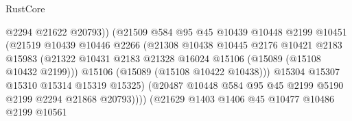 \begin{lexlean}{RustCore}
\begin{coremodule}
                                        @2294
                                        @21622
                                        @20793))
                                    (@21509
                                      @584
                                      @95
                                      @45
                                      @10439
                                      @10448
                                      @2199
                                      @10451
                                      (@21519
                                        @10439
                                        @10446
                                        @2266
                                        (@21308
                                          @10438
                                          @10445
                                          @2176
                                          @10421
                                          @2183
                                          @15983
                                          (@21322
                                            @10431
                                            @2183
                                            @21328
                                            @16024
                                            @15106
                                            (@15089 (@15108 @10432 @2199)))
                                          @15106
                                          (@15089 (@15108 @10422 @10438)))
                                        @15304
                                        @15307
                                        @15310
                                        @15314
                                        @15319
                                        @15325)
                                      (@20487
                                        @10448
                                        @584
                                        @95
                                        @45
                                        @2199
                                        @5190
                                        @2199
                                        @2294
                                        @21868
                                        @20793))))
                                (@21629
                                  @1403
                                  @1406
                                  @45
                                  @10477
                                  @10486
                                  @2199
                                  @10561

\end{coremodule}
\end{lexlean}
